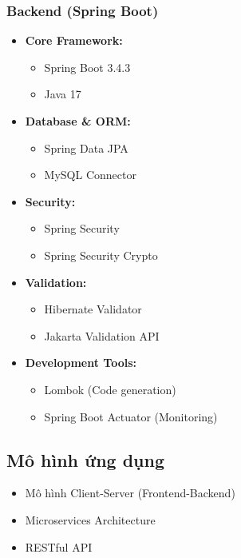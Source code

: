 \documentclass[a4paper,12pt]{article}
\begin{document}
	\subsubsection{Backend (Spring Boot)}
	\begin{itemize}
		\item \textbf{Core Framework:}
		\begin{itemize}
			\item Spring Boot 3.4.3
			\item Java 17
		\end{itemize}
		\item \textbf{Database \& ORM:}
		\begin{itemize}
			\item Spring Data JPA
			\item MySQL Connector
		\end{itemize}
		\item \textbf{Security:}
		\begin{itemize}
			\item Spring Security
			\item Spring Security Crypto
		\end{itemize}
		\item \textbf{Validation:}
		\begin{itemize}
			\item Hibernate Validator
			\item Jakarta Validation API
		\end{itemize}
		\item \textbf{Development Tools:}
		\begin{itemize}
			\item Lombok (Code generation)
			\item Spring Boot Actuator (Monitoring)
		\end{itemize}
	\end{itemize}
	
	\subsection{Mô hình ứng dụng}
	\begin{itemize}
		\item Mô hình Client-Server (Frontend-Backend)
		\item Microservices Architecture
		\item RESTful API
	\end{itemize}
	
\end{document}
